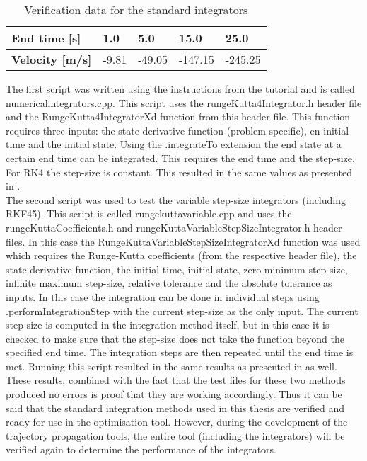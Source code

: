 \begin{table}[!ht]
\begin{center}
\caption{Verification data for the standard integrators}
\label{tab:intverdat}
\begin{tabular}{|l|l|l|l|l|}
\hline 
\textbf{End time [s]} & 1.0	& 5.0 & 15.0 & 25.0 \\ \hline 
\textbf{Velocity [m/s]} & -9.81 & -49.05 & -147.15 & -245.25 \\ \hline
\end{tabular}
\end{center}
\end{table}

The first script was written using the instructions from the tutorial and is called numericalintegrators.cpp. This script uses the rungeKutta4Integrator.h header file and the RungeKutta4IntegratorXd function from this header file. This function requires three inputs: the state derivative function (problem specific), en initial time and the initial state. Using the .integrateTo extension the end state at a certain end time can be integrated. This requires the end time and the step-size. For \ac{RK4} the step-size is constant. This resulted in the same values as presented in .\\

The second script was used to test the variable step-size integrators (including \ac{RKF45}). This script is called rungekuttavariable.cpp and uses the rungeKuttaCoefficients.h and rungeKuttaVariableStepSizeIntegrator.h header files. In this case the RungeKuttaVariableStepSizeIntegratorXd function was used which requires the Runge-Kutta coefficients (from the respective header file), the state derivative function, the initial time, initial state, zero minimum step-size, infinite maximum step-size, relative tolerance and the absolute tolerance as inputs. In this case the integration can be done in individual steps using .performIntegrationStep with the current step-size as the only input. The current step-size is computed in the integration method itself, but in this case it is checked to make sure that the step-size does not take the function beyond the specified end time. The integration steps are then repeated until the end time is met. Running this script resulted in the same results as presented in  as well. \\

These results, combined with the fact that the test files for these two methods produced no errors is proof that they are working accordingly. Thus it can be said that the standard integration methods used in this thesis are verified and ready for use in the optimisation tool. However, during the development of the trajectory propagation tools, the entire tool (including the integrators) will be verified again to determine the performance of the integrators.






